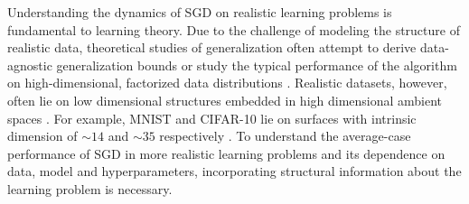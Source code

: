 \documentclass{article} %
\begin{document}
Understanding the dynamics of SGD on realistic learning problems is fundamental to learning theory. Due to the challenge of modeling the structure of realistic data, theoretical studies of generalization often attempt to derive data-agnostic generalization bounds or study the typical performance of the algorithm on high-dimensional, factorized data distributions \citep{engel_van_den_broeck_2001}. %
Realistic datasets, however, often lie on low dimensional structures embedded in high dimensional ambient spaces \citep{pope2021the}. For example, MNIST and CIFAR-10 lie on surfaces with intrinsic dimension of $\sim 14$ and $\sim 35$ respectively \citep{Spigler_2020}. To understand the average-case performance of SGD in more realistic learning problems and its dependence on data, model and hyperparameters, incorporating structural information about the learning problem is necessary.


\end{document}
